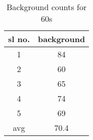 \begin{table}[H]
    \centering
    \begin{tabular}{|c|c|}
        \hline
        sl no. & background \\ \hline
        1      & 84         \\ \hline
        2      & 60         \\ \hline
        3      & 65         \\ \hline
        4      & 74         \\ \hline
        5      & 69         \\ \hline
        avg    & 70.4       \\ \hline
    \end{tabular}
    \label{tab:1}
    \caption{Background counts for 60s}
\end{table}